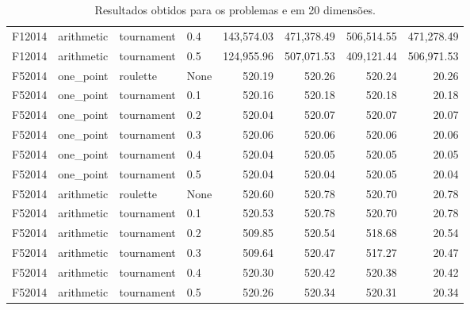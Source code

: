 \begin{table}[!ht]
{\begin{tabular}{llllrrrr}
            F12014                                     & arithmetic & tournament & 0.4  & 143,574.03     & 471,378.49     & 506,514.55     & 471,278.49     \\
            F12014                                     & arithmetic & tournament & 0.5  & 124,955.96     & 507,071.53     & 409,121.44     & 506,971.53     \\
            F52014                                     & one\_point & roulette   & None & 520.19         & 520.26         & 520.24         & 20.26          \\
            F52014                                     & one\_point & tournament & 0.1  & 520.16         & 520.18         & 520.18         & 20.18          \\
            F52014                                     & one\_point & tournament & 0.2  & 520.04         & 520.07         & 520.07         & 20.07          \\
            F52014                                     & one\_point & tournament & 0.3  & 520.06         & 520.06         & 520.06         & 20.06          \\
            F52014                                     & one\_point & tournament & 0.4  & 520.04         & 520.05         & 520.05         & 20.05          \\
            F52014                                     & one\_point & tournament & 0.5  & 520.04         & 520.04         & 520.05         & 20.04          \\
            F52014                                     & arithmetic & roulette   & None & 520.60         & 520.78         & 520.70         & 20.78          \\
            F52014                                     & arithmetic & tournament & 0.1  & 520.53         & 520.78         & 520.70         & 20.78          \\
            F52014                                     & arithmetic & tournament & 0.2  & 509.85         & 520.54         & 518.68         & 20.54          \\
            F52014                                     & arithmetic & tournament & 0.3  & 509.64         & 520.47         & 517.27         & 20.47          \\
            F52014                                     & arithmetic & tournament & 0.4  & 520.30         & 520.42         & 520.38         & 20.42          \\
            F52014                                     & arithmetic & tournament & 0.5  & 520.26         & 520.34         & 520.31         & 20.34          \\
            \toprule
        \end{tabular}%
    }
    \caption{Resultados obtidos para os problemas  e  em 20 dimensões.
    }%
    \label{tab:fitness_20}
\end{table}

